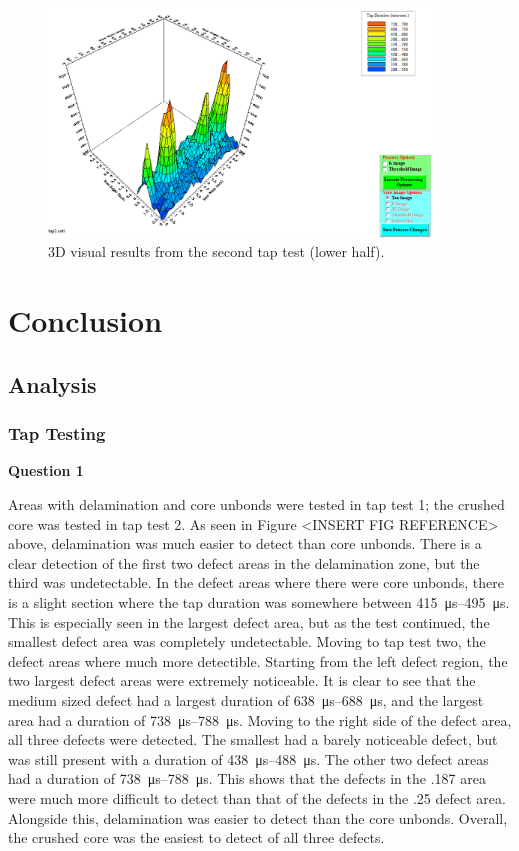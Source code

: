 \documentclass[12 pt]{report}
\begin{document}
\begin{figure}[htbp]
	\centering
	\includegraphics[width=4in]{images/graphs/tap testing/S4G2tap2-3D}
	\caption{3D visual results from the second tap test (lower half).}
	\label{fig:tt2_3d}
\end{figure}

\chapter{Conclusion} \label{conclusion-chapter}
\section{Analysis} \label{analysis}
\subsection{Tap Testing} \label{tap_testing}
\textbf{Question 1}

Areas with delamination and core unbonds were tested in tap test \num{1}; the crushed core was tested in tap test \num{2}. As seen in Figure <INSERT FIG REFERENCE> above, delamination was much easier to detect than core unbonds. There is a clear detection of the first two defect areas in the delamination zone, but the third was undetectable. In the defect areas where there were core unbonds, there is a slight section where the tap duration was somewhere between \qtyrange{415}{495}{\micro\second}. This is especially seen in the largest defect area, but as the test continued, the smallest defect area was completely undetectable. Moving to tap test two, the defect areas where much more detectible. Starting from the left defect region, the two largest defect areas were extremely noticeable. It is clear to see that the medium sized defect had a largest duration of \qtyrange{638}{688}{\micro\second}, and the largest area had a duration of \qtyrange{738}{788}{\micro\second}. Moving to the right side of the defect area, all three defects were detected. The smallest had a barely noticeable defect, but was still present with a duration of \qtyrange{438}{488}{\micro\second}. The other two defect areas had a duration of \qtyrange{738}{788}{\micro\second}. This shows that the defects in the .187 area were much more difficult to detect than that of the defects in the .25 defect area. Alongside this, delamination was easier to detect than the core unbonds. Overall, the crushed core was the easiest to detect of all three defects.
\end{document}
